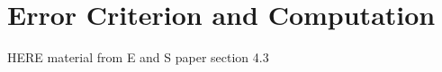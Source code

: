 \documentclass[a4paper]{book}
\def\ZZ{\mathbb Z}
\newtheorem{Proposition}{Proposition}
\begin{document}
\section{Error Criterion and Computation}
\label{sec:mdfa-nonstat}

HERE material from E and S paper section 4.3

% 
% 
\end{document}
